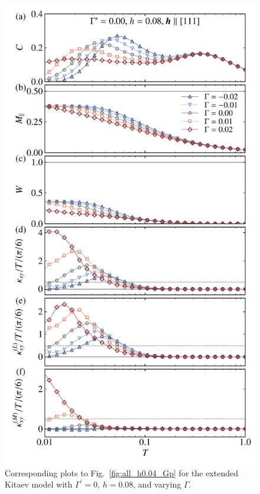 \documentclass[twocolumn,superscriptaddress,showpacs, longbibliography, aps, prx]{revtex4-2}
\begin{document}
\begin{figure}[tbh]
  \begin{center}
    \includegraphics[width=\linewidth]{Data_for_figs/plot/fig-11-XTRG-gamma_dep-008.pdf}
  \end{center}
  \caption{
   Corresponding plots to Fig.~\ref{fig:all_h0.04_Gp} for the extended Kitaev model with $\Gamma^{\prime}=0$, $h=0.08$, and varying $\Gamma$. 
  }
  \label{fig:all_h0.08_G}
\end{figure}
\end{document}
